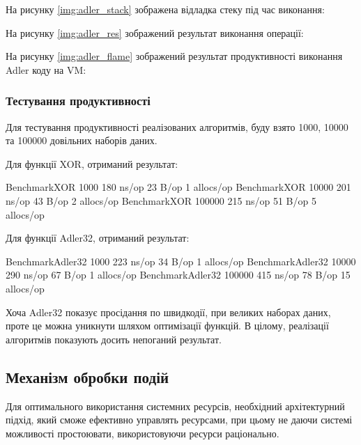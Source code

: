 \documentclass{lib/styles/default-style}
\begin{document}
    На рисунку \ref{img:adler_stack} зображена відладка стеку під час виконання:

    
    На рисунку \ref{img:adler_res} зображений результат виконання операції:


    На рисунку \ref{img:adler_flame} зображений результат продуктивності виконання Adler коду на VM:

    
    \subsubsection{Тестування продуктивності}

    Для тестування продуктивності реалізованих алгоритмів, буду взято 1000, 10000 та 100000 довільних наборів даних.

    Для функції XOR, отриманий результат:
    
    \begin{snippet}
        BenchmarkXOR     1000   180 ns/op  23 B/op  1 allocs/op
        BenchmarkXOR     10000  201 ns/op  43 B/op  2 allocs/op
        BenchmarkXOR     100000 215 ns/op  51 B/op  5 allocs/op\end{snippet}

    Для функції Adler32, отриманий результат:

    \begin{snippet}
        BenchmarkAdler32     1000   223 ns/op  34 B/op  1 allocs/op
        BenchmarkAdler32     10000  290 ns/op  67 B/op  1 allocs/op
        BenchmarkAdler32     100000 415 ns/op  78 B/op  15 allocs/op\end{snippet}
    
    Хоча Adler32 показує просідання по швидкодії, при великих наборах даних, проте це можна уникнути шляхом оптимізації функцій.
    В цілому, реалізації алгоритмів показують досить непоганий результат.

\subsection{Механізм обробки подій}

    Для оптимального використання системних ресурсів, необхідний архітектурний підхід, який сможе ефективно управлять ресурсами,
    при цьому не даючи системі можливості простоювати, використовуючи ресурси раціонально.
\end{document}
